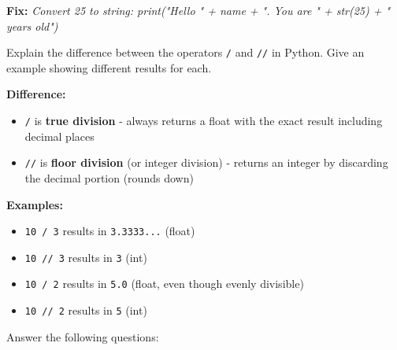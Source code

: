 \documentclass{csexam}
\begin{document}
\begin{questions}
\begin{solution}
\begin{parts}
    \textbf{Fix:} \textit{Convert 25 to string: print("Hello " + name + ". You are " + str(25) + " years old")}
\end{parts}
\end{solution}

\question[6] Explain the difference between the operators \texttt{/} and \texttt{//} in Python. Give an example showing different results for each.

\begin{solution}
\textbf{Difference:}
\begin{itemize}
    \item \texttt{/} is \textbf{true division} - always returns a float with the exact result including decimal places
    \item \texttt{//} is \textbf{floor division} (or integer division) - returns an integer by discarding the decimal portion (rounds down)
\end{itemize}

\textbf{Examples:}
\begin{itemize}
    \item \texttt{10 / 3} results in \texttt{3.3333...} (float)
    \item \texttt{10 // 3} results in \texttt{3} (int)
    \item \texttt{10 / 2} results in \texttt{5.0} (float, even though evenly divisible)
    \item \texttt{10 // 2} results in \texttt{5} (int)
\end{itemize}
\end{solution}

\newpage

\question[6] Answer the following questions:

\begin{solution}
\end{solution}
\end{questions}
\end{document}
